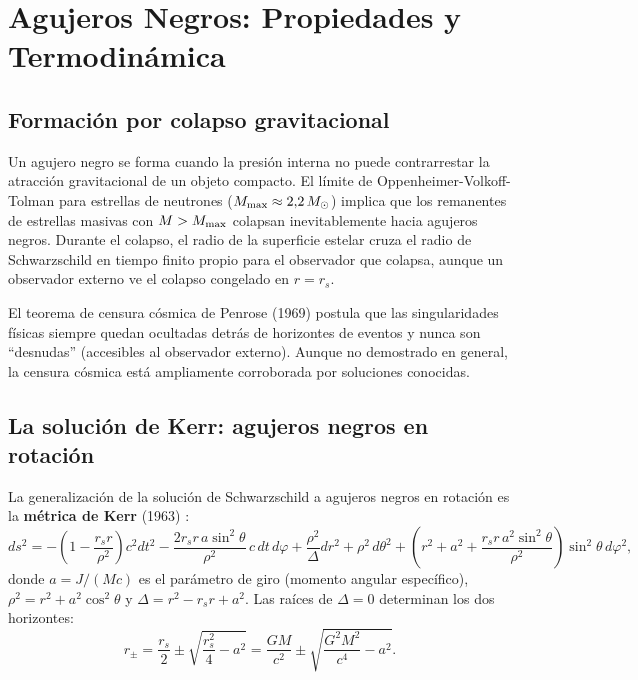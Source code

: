 \section{Agujeros Negros: Propiedades y Termodinámica}
\label{sec:agujeros_negros}

\subsection{Formación por colapso gravitacional}

Un agujero negro se forma cuando la presión interna no puede contrarrestar la atracción gravitacional de un objeto compacto. El límite de Oppenheimer-Volkoff-Tolman para estrellas de neutrones ($M_{\rm max} \approx 2{,}2\,M_\odot$) implica que los remanentes de estrellas masivas con $M > M_{\rm max}$ colapsan inevitablemente hacia agujeros negros. Durante el colapso, el radio de la superficie estelar cruza el radio de Schwarzschild en tiempo finito propio para el observador que colapsa, aunque un observador externo ve el colapso congelado en $r = r_s$.

El teorema de censura cósmica de Penrose (1969) postula que las singularidades físicas siempre quedan ocultadas detrás de horizontes de eventos y nunca son ``desnudas'' (accesibles al observador externo). Aunque no demostrado en general, la censura cósmica está ampliamente corroborada por soluciones conocidas.

\subsection{La solución de Kerr: agujeros negros en rotación}

La generalización de la solución de Schwarzschild a agujeros negros en rotación es la \textbf{métrica de Kerr} (1963) \cite{Kerr1963}:
\begin{equation}
  ds^2 = -\!\left(1 - \frac{r_s r}{\rho^2}\right)c^2 dt^2 - \frac{2r_s r\, a\sin^2\!\theta}{\rho^2}\,c\,dt\,d\varphi
         + \frac{\rho^2}{\Delta}dr^2 + \rho^2\,d\theta^2
         + \left(r^2 + a^2 + \frac{r_s r\,a^2\sin^2\!\theta}{\rho^2}\right)\sin^2\!\theta\,d\varphi^2,
  \label{eq:kerr}
\end{equation}
donde $a = J/(Mc)$ es el parámetro de giro (momento angular específico), $\rho^2 = r^2 + a^2\cos^2\!\theta$ y $\Delta = r^2 - r_s r + a^2$. Las raíces de $\Delta = 0$ determinan los dos horizontes:
\begin{equation}
  r_{\pm} = \frac{r_s}{2} \pm \sqrt{\frac{r_s^2}{4} - a^2} = \frac{GM}{c^2} \pm \sqrt{\frac{G^2M^2}{c^4} - a^2}.
  \label{eq:horizontes_kerr}
\end{equation}

